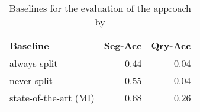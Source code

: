 \begin{table}[t]
 \caption{Baselines for the evaluation of the approach by \citet{Bergsma:2007}}
 \label{table-baselines-bergsma-2007}
 \centering
 \small
 \begin{tabular}{@{}lrr@{}}
  \toprule
 Baseline & Seg-Acc & Qry-Acc\\
  \midrule
  always split & 0.44 & 0.04\\
  never split & 0.55 & 0.04\\
  state-of-the-art (MI) & 0.68 & 0.26\\
  \bottomrule
 \end{tabular}
\end{table}